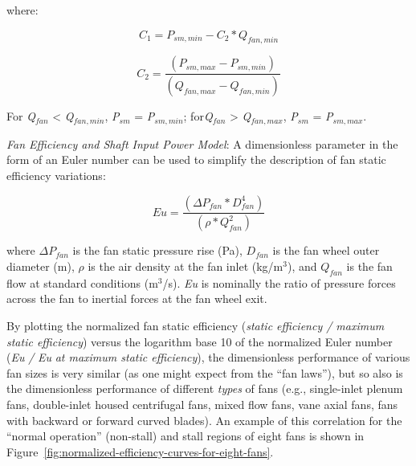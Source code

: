 where:

\begin{equation}
{C_1} = {P_{sm,min }} - {C_2}*{Q_{fan,min }}
\end{equation}

\begin{equation}
{C_2} = \frac{{\left( {{P_{sm,max }} - {P_{sm,min }}} \right)}}{{\left( {{Q_{fan,max }} - {Q_{fan,min }}} \right)}}
\end{equation}

For \emph{Q\(_{fan}\)} \textless{} \emph{Q\(_{fan,min}\)}, \emph{P\(_{sm}\)} = \emph{P\(_{sm,min}\)}; for\emph{Q\(_{fan}\)} \textgreater{} \emph{Q\(_{fan,max}\)}, \emph{P\(_{sm}\)} = \emph{P\(_{sm,max}\)}.

\emph{Fan Efficiency and Shaft Input Power Model}: A dimensionless parameter in the form of an Euler number can be used to simplify the description of fan static efficiency variations:

\begin{equation}
Eu = \frac{{\left( {\Delta {P_{fan}} * D_{fan}^4} \right)}}{{\left( {\rho * Q_{fan}^2} \right)}}
\label{eq:Eu535}
\end{equation}

where \(\Delta {P_{fan}}\) is the fan static pressure rise (Pa), \({D_{fan}}\) is the fan wheel outer diameter (m), \(\rho\) is the air density at the fan inlet (kg/m\(^{3}\)), and \({Q_{fan}}\) is the fan flow at standard conditions (m\(^{3}\)/s). \emph{Eu} is nominally the ratio of pressure forces across the fan to inertial forces at the fan wheel exit.

By plotting the normalized fan static efficiency (\emph{static efficiency / maximum static efficiency}) versus the logarithm base 10 of the normalized Euler number (\emph{Eu} \emph{/} \emph{Eu} \emph{at maximum static efficiency}), the dimensionless performance of various fan sizes is very similar (as one might expect from the ``fan laws''), but so also is the dimensionless performance of different \emph{types} of fans (e.g., single-inlet plenum fans, double-inlet housed centrifugal fans, mixed flow fans, vane axial fans, fans with backward or forward curved blades). An example of this correlation for the ``normal operation'' (non-stall) and stall regions of eight fans is shown in Figure~\ref{fig:normalized-efficiency-curves-for-eight-fans}.

